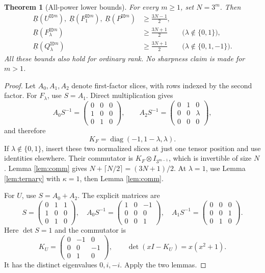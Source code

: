 \documentclass[11pt]{article}
\newtheorem{theorem}{Theorem}[section]
\theoremstyle{remark}\newtheorem{remark}[theorem]{Remark}
\newcommand{\diag}{\operatorname{diag}}
\newcommand{\BR}{\underline R}
\newcommand{\gp}{\boxtimes}
\begin{document}
\begin{theorem}[All-power lower bounds]\label{thm:lower}
For every $m\geq1$, set $N=3^m$. Then
\begin{align}
 \BR(U^{\gp m}),\ \BR(F_1^{\gp m}),\ \BR(P^{\gp m})
 &\geq\frac{3N-1}{2},\label{eq:rank2lower}\\
 \BR(F_\lambda^{\gp m})&\geq\frac{3N+1}{2}
 &&\bigl(\lambda\notin\{0,1\}\bigr),\label{eq:fullcommF}\\
 \BR(Q_\lambda^{\gp m})&\geq\frac{3N+1}{2}
 &&\bigl(\lambda\notin\{0,1,-1\}\bigr).\label{eq:fullcommQ}
\end{align}
All these bounds also hold for ordinary rank. No sharpness claim is made for $m>1$.
\end{theorem}
\begin{proof}
Let $A_0,A_1,A_2$ denote first-factor slices, with rows indexed by the second factor. For $F_\lambda$, use $S=A_1$. Direct multiplication gives
\[
 A_0S^{-1}=\begin{pmatrix}0&0&0\\1&0&0\\0&1&0\end{pmatrix},\qquad
 A_2S^{-1}=\begin{pmatrix}0&1&0\\0&0&\lambda\\0&0&0\end{pmatrix},
\]
and therefore
\begin{equation}\label{eq:KF}
 K_F=\diag(-1,1-\lambda,\lambda).
\end{equation}
If $\lambda\notin\{0,1\}$, insert these two normalized slices at just one tensor position and use identities elsewhere. Their commutator is $K_F\otimes I_{3^{m-1}}$, which is invertible of size $N$. Lemma \ref{lem:comm} gives $N+\lceil N/2\rceil=(3N+1)/2$. At $\lambda=1$, use Lemma \ref{lem:ternary} with $\kappa=1$, then Lemma \ref{lem:comm}.

For $U$, use $S=A_0+A_2$. The explicit matrices are
\[
 S=\begin{pmatrix}0&1&1\\1&0&0\\0&1&0\end{pmatrix},\quad
 A_0S^{-1}=\begin{pmatrix}1&0&-1\\0&0&0\\0&0&1\end{pmatrix},\quad
 A_1S^{-1}=\begin{pmatrix}0&0&0\\0&0&1\\0&1&0\end{pmatrix}.
\]
Here $\det S=1$ and the commutator is
\begin{equation}\label{eq:KU}
 K_U=\begin{pmatrix}0&-1&0\\0&0&-1\\0&1&0\end{pmatrix},
 \qquad \det(xI-K_U)=x(x^2+1).
\end{equation}
It has the distinct eigenvalues $0,i,-i$. Apply the two lemmas.


\end{proof}
\end{document}
